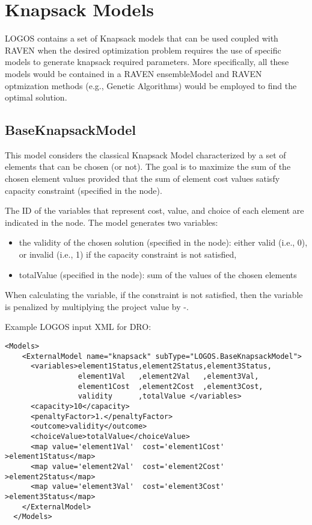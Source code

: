\section{Knapsack Models}
\label{sec:KnapsackModels}

LOGOS contains a set of Knapsack models that can be used coupled with RAVEN when 
the desired optimization problem requires the use of specific models to generate
knapsack required parameters.
More specifically, all these models would be contained in a RAVEN ensembleModel 
and RAVEN optmization methods (e.g., Genetic Algorithms) would be employed to 
find the optimal solution.


\subsection{BaseKnapsackModel}
\label{subsec:BaseKnapsackModel}
This model considers the classical Knapsack Model characterized by a set of elements 
that can be chosen (or not).
The goal is to maximize the sum of the chosen element values provided that the sum of 
element cost values satisfy capacity constraint (specified in the  node).

The ID of the variables that represent cost, value, and choice of each element are 
indicated in the  node.
The model generates two variables:
\begin{itemize}
  \item the validity of the chosen solution (specified in the  node): either 
        valid (i.e., 0), or invalid (i.e., 1) if the capacity constraint is not satisfied,
  \item totalValue (specified in the  node): sum of the values of the 
        chosen elements
\end{itemize}

When calculating the  variable, if the  constraint 
is not satisfied, then the  variable is penalized by multiplying the 
project value by -.

Example LOGOS input XML for DRO:
\begin{lstlisting}[style=XML]
  <Models>
    <ExternalModel name="knapsack" subType="LOGOS.BaseKnapsackModel">
      <variables>element1Status,element2Status,element3Status,
                 element1Val   ,element2Val   ,element3Val,
                 element1Cost  ,element2Cost  ,element3Cost,
                 validity      ,totalValue </variables>
      <capacity>10</capacity>
      <penaltyFactor>1.</penaltyFactor>
      <outcome>validity</outcome>
      <choiceValue>totalValue</choiceValue>
      <map value='element1Val'  cost='element1Cost' >element1Status</map>
      <map value='element2Val'  cost='element2Cost' >element2Status</map>
      <map value='element3Val'  cost='element3Cost' >element3Status</map>
    </ExternalModel>
  </Models>
\end{lstlisting}
